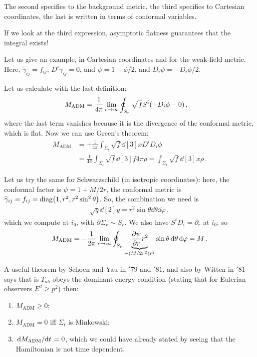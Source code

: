 \documentclass[main.tex]{subfiles}
\begin{document}
The second specifies to the background metric, the third specifies to Cartesian coordinates, the last is written in terms of conformal variables. 

If we look at the third expression, asymptotic flatness guarantees that the integral exists! 

Let us give an example, in Cartesian coordinates and for the weak-field metric. 
Here, \(\widetilde{\gamma}_{ij} = f_{ij}\), \(D^{i} \widetilde{\gamma}_{ij} = 0\), and \(\psi = 1 - \phi / 2\), and \(D_i \psi = - D_i \phi /2\). 

Let us calculate with the last definition: 
%
\begin{align}
M _{\text{ADM}} &= \frac{1}{4 \pi } \lim_{r \to \infty }
\oint_{S_r} \sqrt{f} S^{i} \qty(- D_i \phi - 0 )
\,,
\end{align}
%
where the last term vanishes because it is the divergence of the conformal metric, which is flat. 
Now we can use Green's theorem: 
%
\begin{align}
M _{\text{ADM}} &= + \frac{1}{4\pi } 
\int_{\Sigma _t} \sqrt{f} \dd[3]{x} D^{i} D_i \phi  \\
&= \frac{1}{4 \pi } \int_{\Sigma _t} \sqrt{f} \dd[3]{f} 4 \pi \rho = \int_{\Sigma _t} \sqrt{f} \dd[3]{x} \rho  
\,.
\end{align}

Let us try the same for Schwarzschild (in isotropic coordinates): here, the conformal factor is \(\psi = 1 + M/2 r\), the conformal metric is \(\widetilde{\gamma}_{ij} = f_{ij} = \text{diag}\qty(1, r^2, r^2 \sin^2 \theta )\). 
So, the combination we need is 
%
\begin{align}
\sqrt{q} \dd[2]{y} = r^2 \sin \theta \dd{\theta } \dd{\varphi }
\,,
\end{align}
%
which we compute at \(i_0 \), with \(\partial \Sigma _r \sim S_r\). 
We also have \(S^{i} D_i = \partial_{r}\) at \(i_0 \); so 
%
\begin{align}
M _{\text{ADM}} = - \frac{1}{2 \pi } 
\lim_{r \to \infty } \oint_{S_r} \underbrace{\pdv{\psi }{r} r^2}_{- (M / 2r^2) r^2} \sin \theta \dd{\theta } \dd{\varphi }  = M 
\,.
\end{align}

A useful theorem by Schoen and Yau in \('79\) and \('81\), and also by Witten in \('81\) says that is \(T_{ab}\) obeys the dominant energy condition (stating that for Eulerian observers \(E^2 \geq p^2\)) then: 
\begin{enumerate}
    \item \(M _{\text{ADM}}\geq 0\);
    \item \(M _{\text{ADM}} = 0\) iff \(\Sigma _t\) is Minkowski;
    \item \(\dv*{M _{\text{ADM}}}{t} = 0\), which we could have already stated by seeing that the Hamiltonian is not time dependent. 
\end{enumerate}
\end{document}
